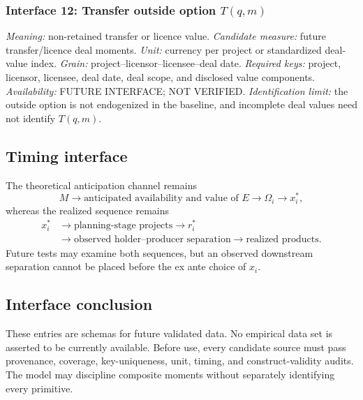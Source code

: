 \subsubsection{Interface 12: Transfer outside option \texorpdfstring{\(T(q,m)\)}{transfer value}}
\textit{Meaning:} non-retained transfer or licence value.
\textit{Candidate measure:} future transfer/licence deal moments.
\textit{Unit:} currency per project or standardized deal-value index.
\textit{Grain:} project--licensor--licensee--deal date.
\textit{Required keys:} project, licensor, licensee, deal date, deal scope,
and disclosed value components.
\textit{Availability:} FUTURE INTERFACE; NOT VERIFIED.
\textit{Identification limit:} the outside option is not endogenized in the
baseline, and incomplete deal values need not identify \(T(q,m)\).

\subsection{Timing interface}
\label{subsec:p10-timing}

The theoretical anticipation channel remains
\begin{equation}
  M
  \longrightarrow
  \text{anticipated availability and value of }E
  \longrightarrow
  \Omega_i
  \longrightarrow
  x_i^*,
  \label{eq:p10-anticipated-interface}
\end{equation}
whereas the realized sequence remains
\begin{equation}
  \begin{aligned}
  x_i^*
  &\longrightarrow
  \text{planning-stage projects}
  \longrightarrow r_i^* \\
  &\longrightarrow
  \text{observed holder--producer separation}
  \longrightarrow
  \text{realized products}.
  \end{aligned}
  \label{eq:p10-realized-interface}
\end{equation}
Future tests may examine both sequences, but an observed downstream separation
cannot be placed before the ex ante choice of \(x_i\).

\subsection{Interface conclusion}
\label{subsec:p10-conclusion}

These entries are schemas for future validated data. No empirical data set is
asserted to be currently available. Before use, every candidate source must pass provenance,
coverage, key-uniqueness, unit, timing, and construct-validity audits. The
model may discipline composite moments without separately identifying every
primitive.
